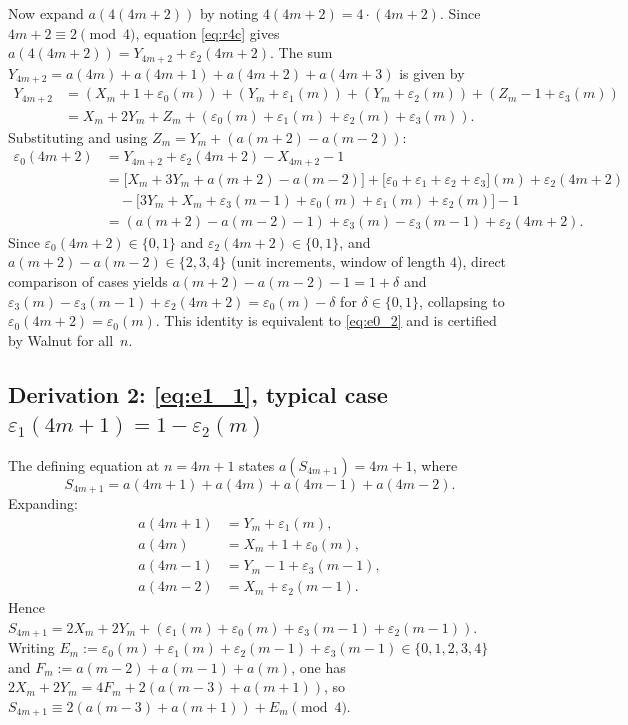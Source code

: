\documentclass[12pt]{article}
\theoremstyle{definition}
\theoremstyle{remark}
\begin{document}
Now expand $a(4(4m+2))$ by noting $4(4m+2) = 4\cdot(4m+2)$.
Since $4m+2\equiv 2\pmod{4}$, equation \eqref{eq:r4c} gives
$a(4(4m+2)) = Y_{4m+2}+\varepsilon_2(4m+2)$.
The sum $Y_{4m+2} = a(4m)+a(4m+1)+a(4m+2)+a(4m+3)$ is given by
\begin{align*}
  Y_{4m+2} &= (X_m+1+\varepsilon_0(m))+(Y_m+\varepsilon_1(m))+(Y_m+\varepsilon_2(m))+(Z_m-1+\varepsilon_3(m))\\
            &= X_m+2Y_m+Z_m+(\varepsilon_0(m)+\varepsilon_1(m)+\varepsilon_2(m)+\varepsilon_3(m)).
\end{align*}
Substituting and using $Z_m = Y_m+(a(m+2)-a(m-2))$:
\begin{align*}
  \varepsilon_0(4m+2)
  &= Y_{4m+2}+\varepsilon_2(4m+2) - X_{4m+2} - 1\\
  &= \bigl[X_m+3Y_m+a(m+2)-a(m-2)\bigr]
     + \bigl[\varepsilon_0+\varepsilon_1+\varepsilon_2+\varepsilon_3\bigr](m)
     + \varepsilon_2(4m+2)\\
  &\quad - \bigl[3Y_m+X_m+\varepsilon_3(m-1)+\varepsilon_0(m)+\varepsilon_1(m)+\varepsilon_2(m)\bigr] - 1\\
  &= (a(m+2)-a(m-2)-1) + \varepsilon_3(m)-\varepsilon_3(m-1) + \varepsilon_2(4m+2).
\end{align*}
Since $\varepsilon_0(4m+2)\in\{0,1\}$ and $\varepsilon_2(4m+2)\in\{0,1\}$, and
$a(m+2)-a(m-2)\in\{2,3,4\}$ (unit increments, window of length $4$), direct
comparison of cases yields $a(m+2)-a(m-2)-1 = 1+\delta$ and
$\varepsilon_3(m)-\varepsilon_3(m-1)+\varepsilon_2(4m+2) = \varepsilon_0(m)-\delta$
for $\delta\in\{0,1\}$, collapsing to $\varepsilon_0(4m+2)=\varepsilon_0(m)$.
This identity is equivalent to \eqref{eq:e0_2} and is certified by Walnut for all~$n$.

\subsection*{Derivation 2: \eqref{eq:e1_1}, typical case $\varepsilon_1(4m+1)=1-\varepsilon_2(m)$}

The defining equation at $n=4m+1$ states $a(S_{4m+1})=4m+1$, where
\[
  S_{4m+1} = a(4m+1)+a(4m)+a(4m-1)+a(4m-2).
\]
Expanding:
\begin{align*}
  a(4m+1) &= Y_m+\varepsilon_1(m),\\
  a(4m)   &= X_m+1+\varepsilon_0(m),\\
  a(4m-1) &= Y_m-1+\varepsilon_3(m-1),\\
  a(4m-2) &= X_m+\varepsilon_2(m-1).
\end{align*}
Hence $S_{4m+1} = 2X_m+2Y_m + (\varepsilon_1(m)+\varepsilon_0(m)+\varepsilon_3(m-1)+\varepsilon_2(m-1))$.
Writing $E_m := \varepsilon_0(m)+\varepsilon_1(m)+\varepsilon_2(m-1)+\varepsilon_3(m-1)\in\{0,1,2,3,4\}$
and $F_m := a(m-2)+a(m-1)+a(m)$, one has $2X_m+2Y_m = 4F_m+2(a(m-3)+a(m+1))$,
so $S_{4m+1} \equiv 2(a(m-3)+a(m+1))+E_m \pmod{4}$.
\end{document}
